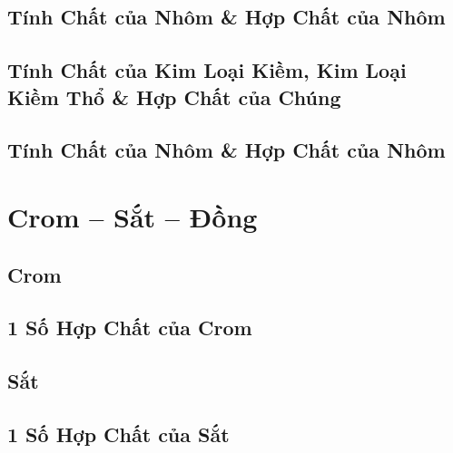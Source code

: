 \documentclass{article}
\numberwithin{equation}{section}
\begin{document}

\subsection{Tính Chất của Nhôm \& Hợp Chất của Nhôm}


\subsection{Tính Chất của Kim Loại Kiềm, Kim Loại Kiềm Thổ \& Hợp Chất của Chúng}


\subsection{Tính Chất của Nhôm \& Hợp Chất của Nhôm}


\section{Crom -- Sắt -- Đồng}

\subsection{Crom}


\subsection{1 Số Hợp Chất của Crom}


\subsection{Sắt}


\subsection{1 Số Hợp Chất của Sắt}
\end{document}
